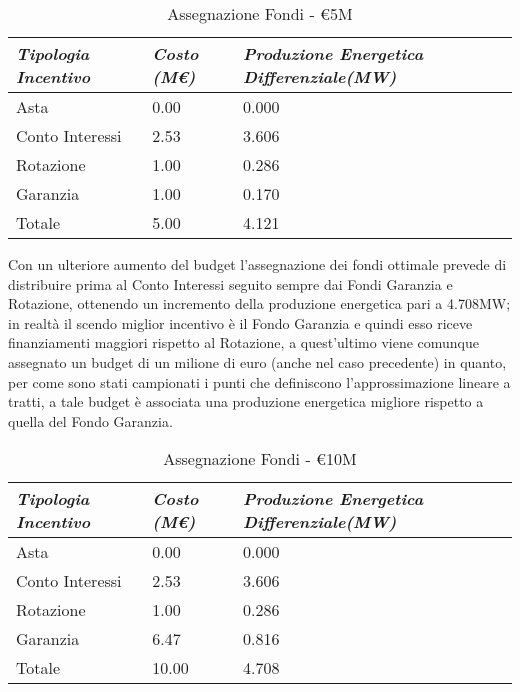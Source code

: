 \begin{table}[h]
\centering
	\begin{tabular}{ p{}  | p{} | p{}  }
		\hline \hline 
		\nohyphens{\emph{Tipologia Incentivo}} & \nohyphens{\emph{Costo (M\euro)}} & \nohyphens{\emph{Produzione Energetica Differenziale(MW)}} \\ \hline
		Asta &  0.00 & 0.000 \\ 
		Conto Interessi & 2.53 & 3.606 \\ 
		Rotazione & 1.00 & 0.286 \\ 
		Garanzia & 1.00 & 0.170 \\ \hline 
		Totale & 5.00 & 4.121 \\
		\hline \hline 
	\end{tabular}
	\caption{Assegnazione Fondi - \euro5M}
	\label{tab:assegnFondi5M}	
\end{table}


Con un ulteriore aumento del budget l'assegnazione dei fondi ottimale prevede di distribuire prima al Conto Interessi seguito sempre dai Fondi Garanzia e Rotazione, ottenendo un incremento della produzione energetica pari a 4.708MW; in realtà il scendo miglior incentivo è il Fondo Garanzia e quindi esso riceve finanziamenti maggiori rispetto al Rotazione, a quest'ultimo viene comunque assegnato un budget di un milione di euro (anche nel caso precedente) in quanto, per come sono stati campionati i punti che definiscono l'approssimazione lineare a tratti, a tale budget è associata una produzione energetica migliore rispetto a quella del Fondo Garanzia.

\begin{table}[h]
\centering
	\begin{tabular}{ p{}  | p{} | p{}  }
		\hline \hline 
		\nohyphens{\emph{Tipologia Incentivo}} & \nohyphens{\emph{Costo (M\euro)}} & \nohyphens{\emph{Produzione Energetica Differenziale(MW)}} \\ \hline
		Asta &  0.00 & 0.000 \\ 
		Conto Interessi & 2.53 & 3.606 \\ 
		Rotazione & 1.00 & 0.286 \\ 
		Garanzia & 6.47 & 0.816 \\ \hline 
		Totale & 10.00 & 4.708 \\
		\hline \hline 
	\end{tabular}
	\caption{Assegnazione Fondi - \euro10M}
	\label{tab:assegnFondi10M}	
\end{table}

